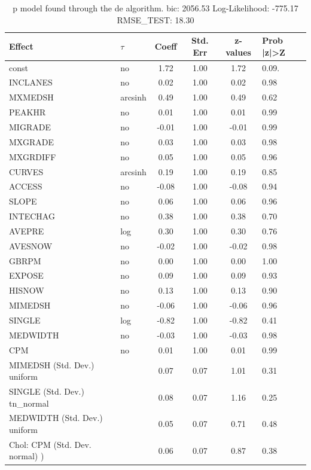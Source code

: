 \begin{table}
	\caption{p model found through the de algorithm. bic: 2056.53 Log-Likelihood: -775.17 RMSE_TEST: 18.30}
	\begin{center}
		\begin{tabular}{|l|l|c|c|c|l|}
			\hline
			Effect & $\tau$ & Coeff & Std. Err & z-values & Prob |z|>Z \\
			\hline
			const & no & 1.72 & 1.00 & 1.72 & 0.09. \\
			\hline
			INCLANES & no & 0.02 & 1.00 & 0.02 & 0.98 \\
			\hline
			MXMEDSH & arcsinh & 0.49 & 1.00 & 0.49 & 0.62 \\
			\hline
			PEAKHR & no & 0.01 & 1.00 & 0.01 & 0.99 \\
			\hline
			MIGRADE & no & -0.01 & 1.00 & -0.01 & 0.99 \\
			\hline
			MXGRADE & no & 0.03 & 1.00 & 0.03 & 0.98 \\
			\hline
			MXGRDIFF & no & 0.05 & 1.00 & 0.05 & 0.96 \\
			\hline
			CURVES & arcsinh & 0.19 & 1.00 & 0.19 & 0.85 \\
			\hline
			ACCESS & no & -0.08 & 1.00 & -0.08 & 0.94 \\
			\hline
			SLOPE & no & 0.06 & 1.00 & 0.06 & 0.96 \\
			\hline
			INTECHAG & no & 0.38 & 1.00 & 0.38 & 0.70 \\
			\hline
			AVEPRE & log & 0.30 & 1.00 & 0.30 & 0.76 \\
			\hline
			AVESNOW & no & -0.02 & 1.00 & -0.02 & 0.98 \\
			\hline
			GBRPM & no & 0.00 & 1.00 & 0.00 & 1.00 \\
			\hline
			EXPOSE & no & 0.09 & 1.00 & 0.09 & 0.93 \\
			\hline
			HISNOW & no & 0.13 & 1.00 & 0.13 & 0.90 \\
			\hline
			MIMEDSH & no & -0.06 & 1.00 & -0.06 & 0.96 \\
			\hline
			SINGLE & log & -0.82 & 1.00 & -0.82 & 0.41 \\
			\hline
			MEDWIDTH & no & -0.03 & 1.00 & -0.03 & 0.98 \\
			\hline
			CPM & no & 0.01 & 1.00 & 0.01 & 0.99 \\
			\hline
			MIMEDSH (Std. Dev.) uniform &  & 0.07 & 0.07 & 1.01 & 0.31 \\
			\hline
			SINGLE (Std. Dev.) tn_normal &  & 0.08 & 0.07 & 1.16 & 0.25 \\
			\hline
			MEDWIDTH (Std. Dev.) uniform &  & 0.05 & 0.07 & 0.71 & 0.48 \\
			\hline
			 Chol: CPM (Std. Dev. normal) ) &  & 0.06 & 0.07 & 0.87 & 0.38 \\
			\hline
		\end{tabular}
	\end{center}
\end{table}